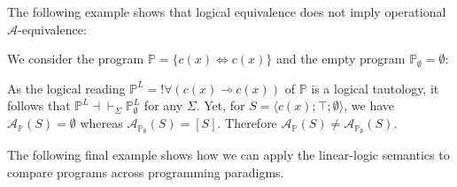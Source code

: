\documentclass[acmtocl]{acmtrans2m}
\newcommand\state[1]{\langle #1 \rangle}
\newcommand{\bbP}{\ensuremath{\mathbb{P}}}
\newcommand{\cA}{\ensuremath{\mathcal{A}}}
\newcommand{\lp}{\multimap}
\begin{document}
The following example shows that logical equivalence does not imply
operational $\cA$-equivalence:

\begin{example}
We consider the program $\bbP = \{c(x)\Leftrightarrow c(x)\}$ and the empty
program $\bbP_\emptyset=\emptyset$:

As the logical reading $\bbP^L=!\forall(c(x)\lp c(x))$ of $\bbP$ is a logical
tautology, it follows that $\bbP^L\dashv\vdash_\Sigma \bbP_\emptyset^L$ for any
$\Sigma$. Yet, for $S=\state{c(x);\top;\emptyset}$, we have
$\cA_\bbP(S)=\emptyset$ whereas $\cA_{\bbP_\emptyset}(S)=[S]$.
Therefore $\cA_{\bbP}(S)\neq\cA_{\bbP_\emptyset}(S)$. \end{example}

The following final example shows how we can apply the linear-logic
semantics to compare programs across programming paradigms.
\end{document}
